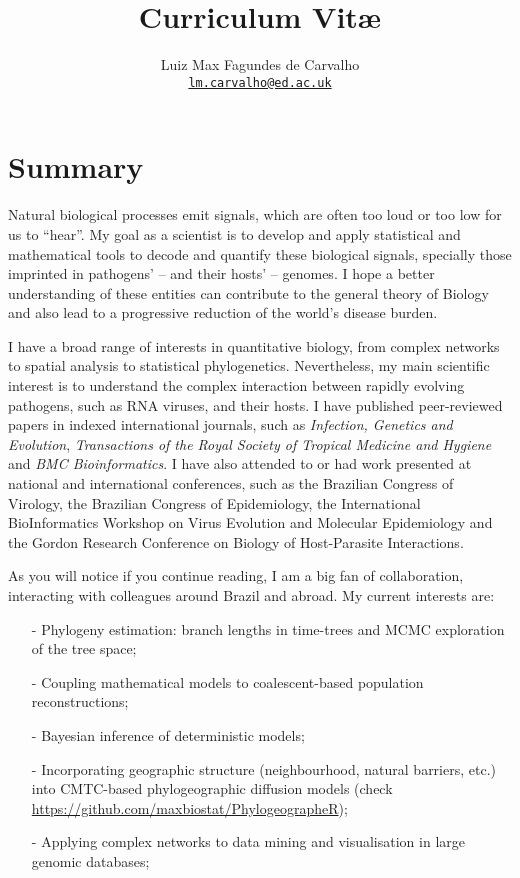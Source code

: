 \documentclass[10pt]{article}
\title{\bfseries Curriculum Vit\ae}
\author{Luiz Max Fagundes de Carvalho \\
\href{mailto:lm.carvalho@ed.ac.uk}{\nolinkurl{lm.carvalho@ed.ac.uk}}}
\affil{Rambaut Group, Institute of Evolutionary Biology, School of Biological Sciences, University of Edinburgh, UK.}
\date{}
\begin{document}
\maketitle
\section*{Summary}
Natural biological processes emit signals, which are often too loud or too low for us to ``hear''.
My goal as a scientist is to develop and apply statistical and mathematical tools to decode and quantify these biological signals, specially those imprinted in pathogens' -- and their hosts' -- genomes.
I hope a better understanding of these entities can contribute to the general theory of Biology and also lead to a progressive reduction of the world's disease burden.

I have a broad range of interests in quantitative biology, from complex networks to spatial analysis to statistical phylogenetics.
Nevertheless, my main scientific interest is to understand the complex interaction between rapidly evolving pathogens, such as {RNA} viruses, and their hosts.
I have published peer-reviewed papers in indexed international journals, such as \textit{Infection, Genetics and Evolution}, \textit{Transactions of the Royal Society of Tropical Medicine and Hygiene} and \textit{BMC Bioinformatics}.
I have also attended to or had work presented at national and international conferences, such as the Brazilian Congress of Virology, the Brazilian Congress of Epidemiology, the International BioInformatics Workshop on Virus Evolution and Molecular Epidemiology and the Gordon Research Conference on Biology of Host-Parasite Interactions.

As you will notice if you continue reading, I am a big fan of collaboration, interacting with colleagues around Brazil and abroad.
My current interests are:
\begin{itemize}
\itemsep0.1em
 \item [-] Phylogeny estimation: branch lengths in time-trees and MCMC exploration of the tree space;
 \item [-] Coupling mathematical models to coalescent-based population reconstructions;
 \item [-] Bayesian inference of deterministic models;
 \item [-] Incorporating geographic structure (neighbourhood, natural barriers, etc.) into CMTC-based phylogeographic diffusion models (check \url{https://github.com/maxbiostat/PhylogeographeR});
 \item [-] Applying complex networks to data mining and visualisation in large genomic databases; 
\end{itemize}
\end{document}
